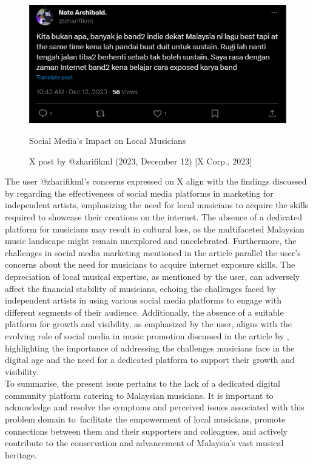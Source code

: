 \begin{figure}[h]
    \centering
    \includegraphics[width=0.8\linewidth]{mainmatter/images/probstate2.png}
    \caption{Social Media's Impact on Local Musicians}
    \caption*{X post by @zharifikml (2023, December 12) [X Corp., 2023]}
    \label{fig:myfig}
\end{figure}
The user @zharifikml's concerns expressed on X align with the findings discussed by \textcite{zanuar22} regarding the effectiveness of social media platforms in marketing for independent artists, emphasizing the need for local musicians to acquire the skills required to showcase their creations on the internet. The absence of a dedicated platform for musicians may result in cultural loss, as the multifaceted Malaysian music landscape might remain unexplored and uncelebrated. Furthermore, the challenges in social media marketing mentioned in the article parallel the user's concerns about the need for musicians to acquire internet exposure skills. The depreciation of local musical expertise, as mentioned by the user, can adversely affect the financial stability of musicians, echoing the challenges faced by independent artists in using various social media platforms to engage with different segments of their audience. Additionally, the absence of a suitable platform for growth and visibility, as emphasized by the user, aligns with the evolving role of social media in music promotion discussed in the article by \textcite{jarvekulg21}, highlighting the importance of addressing the challenges musicians face in the digital age and the need for a dedicated platform to support their growth and visibility. \\

To summarise, the present issue pertains to the lack of a dedicated digital community platform catering to Malaysian musicians. It is important to acknowledge and resolve the symptoms and perceived issues associated with this problem domain to facilitate the empowerment of local musicians, promote connections between them and their supporters and colleagues, and actively contribute to the conservation and advancement of Malaysia's vast musical heritage.

